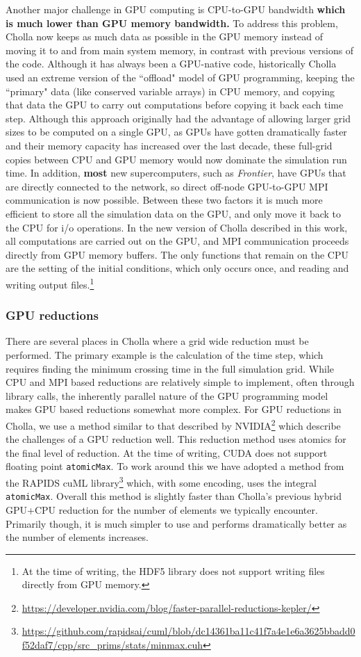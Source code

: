 \documentclass[modern, linenumbers]{aastex631}
\begin{document}
Another major challenge in GPU computing is CPU-to-GPU bandwidth \textbf{which is much lower than GPU memory bandwidth.} To address this problem, Cholla now keeps as much data as possible in the GPU memory instead of moving it to and from main system memory, in contrast with previous versions of the code. Although it has always been a GPU-native code, historically Cholla used an extreme version of the ``offload" model of GPU programming, keeping the ``primary" data (like conserved variable arrays) in CPU memory, and copying that data the GPU to carry out computations before copying it back each time step. Although this approach originally had the advantage of allowing larger grid sizes to be computed on a single GPU, as GPUs have gotten dramatically faster and their memory capacity has increased over the last decade, these full-grid copies between CPU and GPU memory would now dominate the simulation run time. In addition, \textbf{most} new supercomputers, such as \textit{Frontier}, have GPUs that are directly connected to the network, so direct off-node GPU-to-GPU MPI communication is now possible. Between these two factors it is much more efficient to store all the simulation data on the GPU, and only move it back to the CPU for i/o operations. In the new version of Cholla described in this work, all computations are carried out on the GPU, and  MPI communication proceeds directly from GPU memory buffers. The only functions that remain on the CPU are the setting of the initial conditions, which only occurs once, and reading and writing output files.\footnote{At the time of writing, the HDF5 library does not support writing files directly from GPU memory.}

\subsubsection{GPU reductions}

There are several places in Cholla where a grid wide reduction must be performed. The primary example is the calculation of the time step, which requires finding the minimum crossing time in the full simulation grid. While CPU and MPI based reductions are relatively simple to implement, often through library calls, the inherently parallel nature of the GPU programming model makes GPU based reductions somewhat more complex. For GPU reductions in Cholla, we use a method similar to that described by NVIDIA\footnote{\url{https://developer.nvidia.com/blog/faster-parallel-reductions-kepler/}} which describe the challenges of a GPU reduction well. This reduction method uses atomics for the final level of reduction. At the time of writing, CUDA does not support floating point \texttt{atomicMax}. To work around this we have adopted a method from the RAPIDS cuML library\footnote{\url{https://github.com/rapidsai/cuml/blob/dc14361ba11c41f7a4e1e6a3625bbadd0f52daf7/cpp/src\_prims/stats/minmax.cuh}} which, with some encoding, uses the integral \texttt{atomicMax}. Overall this method is slightly faster than Cholla's previous hybrid GPU+CPU reduction for the number of elements we typically encounter. Primarily though, it is much simpler to use and performs dramatically better as the number of elements increases.
\end{document}
